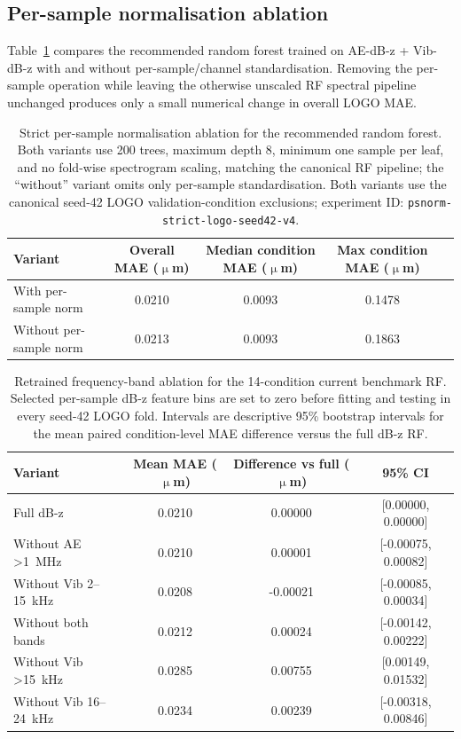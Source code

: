 \subsection*{Per-sample normalisation ablation}

Table~\ref{tab:supp-psnorm-ablation} compares the recommended random
forest trained on AE-dB-z + Vib-dB-z with and without
per-sample/channel standardisation. Removing the per-sample operation while
leaving the otherwise unscaled RF spectral pipeline unchanged produces only
a small numerical change in overall LOGO MAE.

\begin{table}[htbp]
\centering
\caption{Strict per-sample normalisation ablation for the recommended
random forest. Both variants use 200 trees, maximum depth 8, minimum one
sample per leaf, and no fold-wise spectrogram scaling, matching the
canonical RF pipeline; the ``without'' variant omits only per-sample
standardisation. Both variants use the canonical seed-42 LOGO
validation-condition exclusions; experiment ID:
\texttt{psnorm-strict-logo-seed42-v4}.}\label{tab:supp-psnorm-ablation}
\begin{tabular}{@{}lcccc@{}}
\toprule
Variant & Overall MAE (\(\upmu\)m) & Median condition MAE (\(\upmu\)m) & Max condition MAE (\(\upmu\)m) \\
\midrule
With per-sample norm & 0.0210 & 0.0093 & 0.1478 \\
Without per-sample norm & 0.0213 & 0.0093 & 0.1863 \\
\bottomrule
\end{tabular}
\end{table}

\begin{table}[htbp]
\centering
\caption{Retrained frequency-band ablation for the 14-condition current
benchmark RF. Selected
per-sample dB-z feature bins are set to zero before fitting and testing in
every seed-42 LOGO fold. Intervals are descriptive 95\% bootstrap intervals
for the mean paired condition-level MAE difference versus the full dB-z RF.}
\label{tab:supp-retrained-band-ablation}
\begin{tabular}{@{}lccc@{}}
\toprule
Variant & Mean MAE (\(\upmu\)m) & Difference vs full (\(\upmu\)m) & 95\% CI \\
\midrule
Full dB-z & 0.0210 & 0.00000 & [0.00000, 0.00000] \\
Without AE >1~MHz & 0.0210 & 0.00001 & [-0.00075, 0.00082] \\
Without Vib 2--15~kHz & 0.0208 & -0.00021 & [-0.00085, 0.00034] \\
Without both bands & 0.0212 & 0.00024 & [-0.00142, 0.00222] \\
Without Vib >15~kHz & 0.0285 & 0.00755 & [0.00149, 0.01532] \\
Without Vib 16--24~kHz & 0.0234 & 0.00239 & [-0.00318, 0.00846] \\
\bottomrule
\end{tabular}
\end{table}

